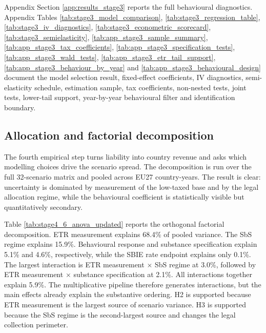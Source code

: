 \documentclass[11pt,a4paper]{article}
\begin{document}
Appendix Section \ref{app:results_stage3} reports the full behavioural diagnostics. Appendix Tables \ref{tab:stage3_model_comparison}, \ref{tab:stage3_regression_table}, \ref{tab:stage3_iv_diagnostics}, \ref{tab:stage3_econometric_scorecard}, \ref{tab:stage3_semielasticity}, \ref{tab:app_stage3_sample_summary}, \ref{tab:app_stage3_tax_coefficients}, \ref{tab:app_stage3_specification_tests}, \ref{tab:app_stage3_wald_tests}, \ref{tab:app_stage3_etr_tail_support}, \ref{tab:app_stage3_behaviour_by_year} and \ref{tab:app_stage3_behavioural_design} document the model selection result, fixed-effect coefficients, IV diagnostics, semi-elasticity schedule, estimation sample, tax coefficients, non-nested tests, joint tests, lower-tail support, year-by-year behavioural filter and identification boundary.

\subsection{Allocation and factorial decomposition}\label{sec:results_factorial}

The fourth empirical step turns liability into country revenue and asks which modelling choices drive the scenario spread. The decomposition is run over the full 32-scenario matrix and pooled across EU27 country-years. The result is clear: uncertainty is dominated by measurement of the low-taxed base and by the legal allocation regime, while the behavioural coefficient is statistically visible but quantitatively secondary.



Table \ref{tab:stage4_6_anova_updated} reports the orthogonal factorial decomposition. ETR measurement explains 68.4\% of pooled variance. The SbS regime explains 15.9\%. Behavioural response and substance specification explain 5.1\% and 4.6\%, respectively, while the SBIE rate endpoint explains only 0.1\%. The largest interaction is ETR measurement $\times$ SbS regime at 3.0\%, followed by ETR measurement $\times$ substance specification at 2.1\%. All interactions together explain 5.9\%. The multiplicative pipeline therefore generates interactions, but the main effects already explain the substantive ordering. H2 is supported because ETR measurement is the largest source of scenario variance. H3 is supported because the SbS regime is the second-largest source and changes the legal collection perimeter.


\end{document}
